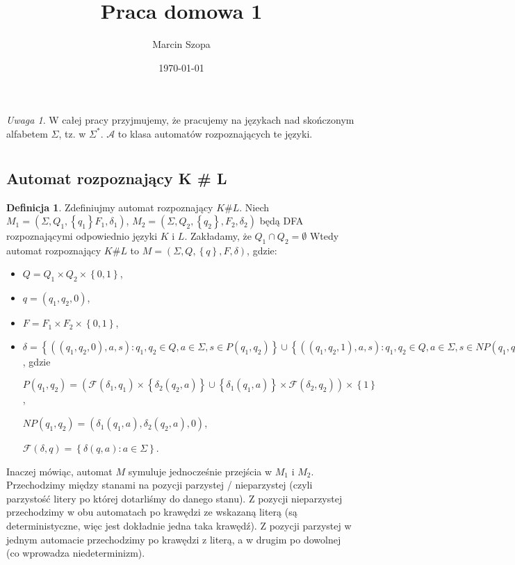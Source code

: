 \documentclass{article}
\title{Praca domowa 1}
\author{Marcin Szopa}
\date{\today}
\theoremstyle{definition}
\newtheorem{definition}{Definicja}[section]
\theoremstyle{remark}
\newtheorem*{remark}{Uwaga}
\newcommand{\singleton}[1]{\left\{ #1 \right\}}
\begin{document}
\maketitle

\begin{remark}
    W całej pracy przyjmujemy, że pracujemy na językach nad skończonym alfabetem \(\Sigma\), tz. w \( \Sigma^* \). \(\mathcal{A}\) to klasa automatów rozpoznających te języki.
\end{remark}

\section{}

\subsection{Automat rozpoznający K \# L}

\begin{definition}

Zdefiniujmy automat rozpoznający \(K \# L\).
Niech \(M_1 = (\Sigma, Q_1, \singleton{q_1} F_1, \delta_1)\), \(M_2 = (\Sigma, Q_2, \singleton{q_2}, F_2, \delta_2)\)
będą DFA rozpoznającymi odpowiednio języki \(K\) i \(L\). Zakładamy, że \(Q_1 \cap Q_2 = \emptyset\) Wtedy automat rozpoznający \(K \# L\) to
\(M = (\Sigma, Q, \singleton{q}, F, \delta)\), gdzie:

\begin{itemize}
    \item \(Q = Q_1 \times Q_2 \times \left\{ 0, 1 \right\}\),
    \item \(q = (q_1, q_2, 0)\),
    \item \(F = F_1 \times F_2 \times \left\{ 0, 1 \right\} \),
    \item \(\delta = \left\{ \left( \left(q_1, q_2, 0 \right), a, s \right): q_1, q_2 \in Q, a \in \Sigma, s \in P(q_1, q_2) \right\}
    \cup \left\{ \left( \left(q_1, q_2, 1 \right), a, s\right): q_1, q_2 \in Q, a \in \Sigma, s \in NP(q_1, q_2) \right\} \), gdzie

    \(P(q_1, q_2) = \left( \mathcal{F}(\delta_1, q_1) \times \singleton{\delta_2(q_2,a)}
    \cup \singleton{\delta_1(q_1,a)} \times \mathcal{F}(\delta_2, q_2) \right) \times \singleton{1}\),

    \(NP(q_1, q_2) =  \left( \delta_1(q_1,a), \delta_2(q_2,a), 0 \right)\),

    \(\mathcal{F}(\delta, q) = \left\{ \delta(q, a): a \in \Sigma \right\}\).
\end{itemize}

Inaczej mówiąc, automat \(M\) symuluje jednocześnie przejścia w \(M_1\) i \(M_2\).
Przechodzimy między stanami na pozycji parzystej / nieparzystej (czyli parzystość litery po której dotarliśmy do danego stanu).
Z pozycji nieparzystej przechodzimy w obu automatach po krawędzi ze wskazaną literą (są deterministyczne, więc jest dokładnie jedna taka krawędź).
Z pozycji parzystej w jednym automacie przechodzimy po krawędzi z literą, a w drugim po dowolnej (co wprowadza niedeterminizm).
\end{definition}
\end{document}
